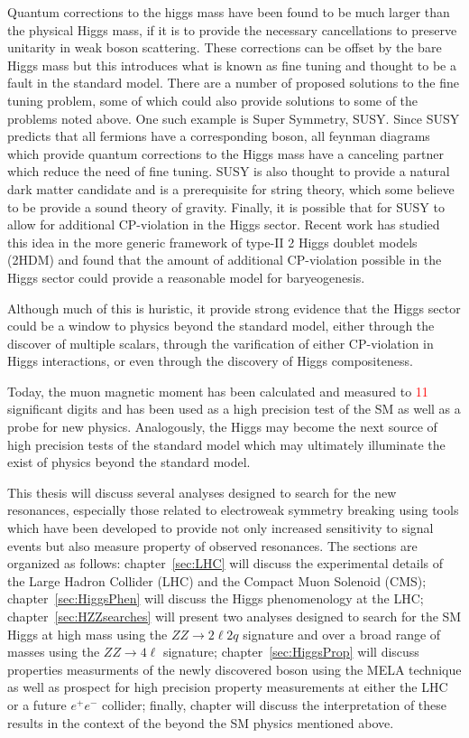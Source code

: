 Quantum corrections to the higgs mass have been found to be much 
larger than the physical Higgs mass, if it is to provide the necessary   
cancellations to preserve unitarity in weak boson scattering.  These 
corrections can be offset by the bare Higgs mass but this introduces
what is known as fine tuning and thought to be a fault in the standard
model.  There are a number of proposed solutions to the fine tuning 
problem, some of which could also provide solutions to some of the 
problems noted above.  One such example is Super Symmetry, SUSY.  
Since SUSY predicts that all fermions have a corresponding boson, 
all feynman diagrams which provide quantum corrections to the Higgs 
mass have a canceling partner which reduce the need of fine tuning. 
SUSY is also thought to provide a natural dark matter candidate and
is a prerequisite for string theory, which some believe to be provide
a sound theory of gravity.  Finally, it is possible that for SUSY 
to allow for additional CP-violation in the Higgs sector.  Recent work
has studied this idea in the more generic framework of type-II 2 Higgs
doublet models (2HDM) and found that the amount of additional CP-violation
possible in the Higgs sector could provide a reasonable model for 
baryeogenesis.  

Although much of this is huristic, it provide strong evidence 
that the Higgs sector could be a window to physics beyond the standard
model, either through the discover of multiple scalars, through 
the varification of either CP-violation in Higgs interactions, or 
even through the discovery of Higgs compositeness.  

Today, the muon 
magnetic moment has been calculated and measured to \textcolor{red}{11} 
significant digits and has been used as a high precision test of the SM 
as well as a probe for new physics.   Analogously, the Higgs may become
the next source of high precision tests of the standard model which may
ultimately illuminate the exist of physics beyond the standard model.  

This thesis will discuss several analyses designed to search for the
new resonances, especially those related to electroweak symmetry 
breaking using tools which have been developed to provide not only 
increased sensitivity to signal events but also measure property of 
observed resonances. 
The sections are organized as follows: chapter~\ref{sec:LHC} will 
discuss the experimental details of the Large Hadron Collider (LHC) and 
the Compact Muon Solenoid (CMS); chapter~\ref{sec:HiggsPhen} will discuss 
the Higgs phenomenology at the LHC; chapter~\ref{sec:HZZsearches} will
present two analyses designed to search for the SM Higgs at high mass
using the $ZZ\to2\ell 2q$ signature and over a broad range of masses
using the $ZZ\to 4\ell$ signature; chapter~\ref{sec:HiggsProp} will discuss
properties measurments of the newly discovered boson using the MELA 
technique as well as prospect for high precision property measurements
at either the LHC or a future $e^+e^-$ collider; finally, chapter will
discuss the interpretation of these results in the context of the 
beyond the SM physics mentioned above.  



